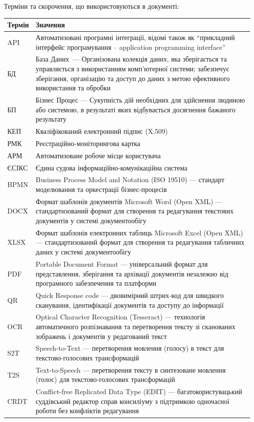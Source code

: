 \documentclass{article}
\begin{document}
Терміни та скорочення, що використовуються в документі:

\begin{longtable}{p{4cm}p{10cm}}
\toprule
\textbf{Термін} & \textbf{Значення} \\
\midrule
API & Автоматизовані програмні інтеграції, відомі також як “прикладний інтерфейс програмування – application programming interface” \\
БД & База Даних — Організована колекція даних, яка зберігається та управляється з використанням комп'ютерної системи; забезпечує зберігання, організацію та доступ до даних з метою ефективного використання та обробки \\
БП & Бізнес Процес — Сукупність дій необхідних для здійснення людиною або системою, в результаті яких відбувається досягнення бажаного результату \\
КЕП & Кваліфікований електронний підпис (X.509) \\
РМК & Реєстраційно-моніторингова картка \\
АРМ & Автоматизоване робоче місце користувача \\
ЄСІКС & Єдина судова інформаційно-комунікаційна система \\
BPMN & Business Process Model and Notation (ISO 19510) — стандарт моделювання та оркестрації бізнес-процесів \\
DOCX & Формат шаблонів документів Microsoft Word (Open XML) — стандартизований формат для створення та редагування текстових документів у системі документообігу \\
XLSX & Формат шаблонів електронних таблиць Microsoft Excel (Open XML) — стандартизований формат для створення та редагування табличних даних у системі документообігу \\
PDF & Portable Document Format — універсальний формат для представлення, зберігання та архівації документів незалежно від програмного забезпечення та платформи \\
QR & Quick Response code — двовимірний штрих-код для швидкого сканування, ідентифікації документів та доступу до інформації \\
OCR & Optical Character Recognition (Tesseract) — технологія автоматичного розпізнавання та перетворення тексту зі сканованих зображень і документів у редагований текст \\
S2T & Speech-to-Text — перетворення мовлення (голосу) в текст для текстово-голосових трансформацій \\
T2S & Text-to-Speech — перетворення тексту в синтезоване мовлення (голос) для текстово-голосових трансформацій \\
CRDT & Conflict-free Replicated Data Type (EDIT) — багатокористувацький суддівський редактор справ консиліуму з підтримкою одночасної роботи без конфліктів редагування \\
\bottomrule
\end{longtable}
\end{document}
